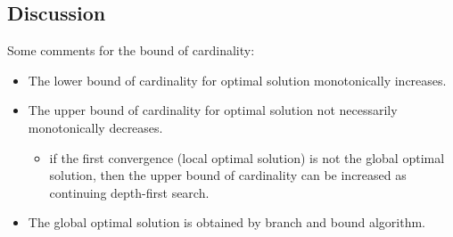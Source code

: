 \documentclass[paper=a4, fontsize=11pt]{scrartcl} %
\numberwithin{equation}{section} %
\numberwithin{figure}{section} %
\numberwithin{table}{section} %
\begin{document}
\subsection{Discussion}

Some comments for the bound of cardinality:

\begin{itemize}
\item The lower bound of cardinality for optimal solution monotonically increases. 
\item The upper bound of cardinality for optimal solution not necessarily monotonically decreases.
	\begin{itemize}
	\item if the first convergence (local optimal solution) is not the global optimal solution, then the upper bound of cardinality can be increased as continuing depth-first search.
	\end{itemize}
\item The global optimal solution is obtained by branch and bound algorithm. 
\end{itemize}
\end{document}
